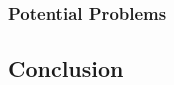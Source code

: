 \documentclass[a4paper]{article}
\newcommand*{\ShowReferences}{} %
\begin{document}

\subsubsection{Potential Problems} %
\label{sec:SynthesisableProperties_potentialProblems}



\subsection{Conclusion} %
\label{sec:SynthesisableProperties_conclusion}





\ifdefined\ShowReferences
  \newpage
  
  {} %
\fi

\ifdefined\ShowGlossary
  \clearpage
  \printnoidxglossary[sort=letter]
\fi

\end{document}
